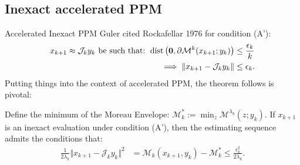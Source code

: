 \documentclass[11pt]{beamer}
\begin{document}
    \subsection{Inexact accelerated PPM}
        \begin{frame}{Accelerated Inexact PPM}
            Guler cited Rockafellar 1976 \cite{rockafellar_monotone_1976} for condition (A'): 
            \begin{align*}
                x_{k + 1}\approx \mathcal J_{k} y_k \text{ be such that: }
                \operatorname{dist}\left(
                    \mathbf 0, \partial \mathcal M^{k}(x_{k + 1}; y_k)
                \right) &\le \frac{\epsilon_k}{k}
                \\
                \implies 
                \Vert x_{k + 1} - \mathcal J_{k}y_k\Vert 
                &\le \epsilon_k. 
            \end{align*}
            Putting things into the context of accelerated PPM, the theorem follows is pivotal: 
            \begin{theorem}
                Define the minimum of the Moreau Envelope: $\mathcal M_k^* := \min_z \mathcal {M}^{\lambda_k}(z; y_k)$. 
                If $x_{k +1}$ is an inexact evaluation under condition (A'), then the estimating sequence admits the conditions that: 
                \begin{align*}
                    \frac{1}{2\lambda_k} \Vert x_{k + 1} - \mathcal J_k y_k\Vert^2
                    &= 
                    \mathcal M_k(x_{k + 1}, y_k) - \mathcal M^*_k
                    \le \frac{\epsilon_k^2}{2\lambda_k}. 
                \end{align*}
            \end{theorem}
        \end{frame}
\end{document}
